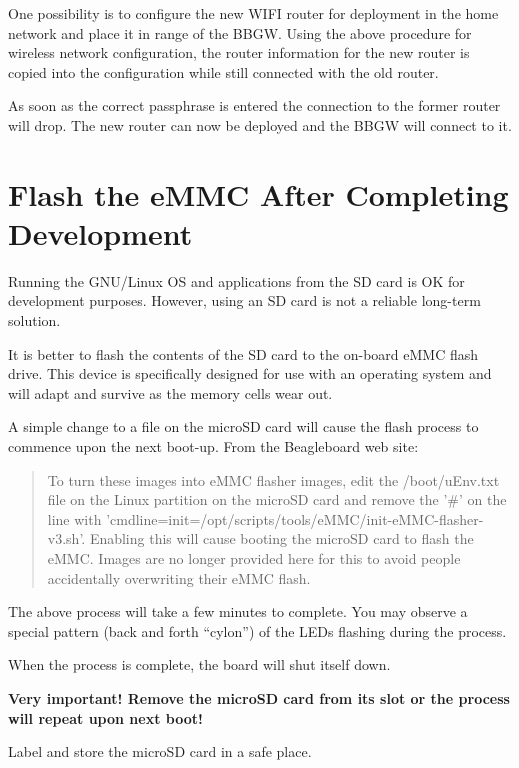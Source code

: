 One possibility is to configure the new WIFI router for deployment in the home 
network and place it in range of the BBGW.  Using the above procedure for 
wireless network configuration, the router information for the new router is 
copied into the configuration while still connected with the old router.

As soon as the correct passphrase is entered the connection to the former 
router will drop.  The new router can now be deployed and the BBGW will connect 
to it.

\section{Flash the eMMC After Completing Development}

Running the GNU/Linux OS and applications from the SD card is OK for 
development purposes.  However, using an SD card is not a reliable long-term 
solution.

It is better to flash the contents of the SD card to the on-board eMMC flash 
drive.  This device is specifically designed for use with an operating system 
and will adapt and survive as the memory cells wear out.

A simple change to a file on the microSD card will cause the flash process to 
commence upon the next boot-up.  From the Beagleboard web site:

\begin{quotation}
To turn these images into eMMC flasher images, edit the /boot/uEnv.txt file on 
the Linux partition on the microSD card and remove the '\#' on the line with 
'cmdline=init=/opt/scripts/tools/eMMC/init-eMMC-flasher-v3.sh'. Enabling this 
will cause booting the microSD card to flash the eMMC. Images are no longer 
provided here for this to avoid people accidentally overwriting their eMMC 
flash.
\end{quotation}

The above process will take a few minutes to complete.  You may observe a 
special pattern (back and forth ``cylon'') of the LEDs flashing during the 
process.

When the process is complete, the board will shut itself down.

\textbf{Very important!  Remove the microSD card from its slot or the process 
will repeat upon next boot!}

Label and store the microSD card in a safe place.







